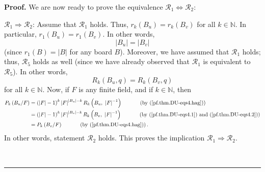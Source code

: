 \documentclass[numbers=enddot,12pt,final,onecolumn,notitlepage]{scrartcl}%
\theoremstyle{definition}
\newenvironment{proof}[1][Proof]{\noindent\textbf{#1.} }{\ \rule{0.5em}{0.5em}}
\newcommand{\NN}{\mathbb{N}}
\newenvironment{verlong}{}{}
\begin{document}
\begin{verlong}
\begin{proof}
We are now ready to prove the equivalence $\mathcal{R}_1\Longleftrightarrow
\mathcal{R}_2$:

$\mathcal{R}_1\Longrightarrow\mathcal{R}_2$:
Assume that $\mathcal{R}_1$ holds. Thus, $r_{k}\left(  B_{u}\right)  =r_{k}\left(  B_{v}\right)  $
for all $k\in\NN$. In particular, $r_{1}\left(  B_{u}\right)
=r_{1}\left(  B_{v}\right)  $. In other words,
\begin{equation}
\left\vert B_{u}\right\vert =\left\vert B_{v}\right\vert
\label{pf.thm.DU-eqs4.1}%
\end{equation}
(since $r_{1}\left(  B\right)  =\left\vert B\right\vert $ for any board $B$).
Moreover, we have assumed that $\mathcal{R}_1$ holds; thus, $\mathcal{R}_5$ holds as well
(since we have already observed that $\mathcal{R}_1$ is
equivalent to $\mathcal{R}_5$). In other words,%
\begin{equation}
R_{k}\left(  B_{u},q\right)  =R_{k}\left(  B_{v},q\right)
\label{pf.thm.DU-eqs4.2}%
\end{equation}
for all $k\in\NN$. Now, if $F$ is any finite field, and if
$k\in\NN$, then%
\begin{align*}
P_{k}\left(  B_{u}/F\right)    & =\left(  \left\vert F\right\vert -1\right)
^{k}\left\vert F\right\vert ^{\left\vert B_{u}\right\vert -k}R_{k}\left(
B_{u},\ \left\vert F\right\vert ^{-1}\right)  \ \ \ \ \ \ \ \ \ \ \left(
\text{by (\ref{pf.thm.DU-eqs4.hag})}\right)  \\
& =\left(  \left\vert F\right\vert -1\right)  ^{k}\left\vert F\right\vert
^{\left\vert B_{v}\right\vert -k}R_{k}\left(  B_{v},\ \left\vert F\right\vert
^{-1}\right)  \ \ \ \ \ \ \ \ \ \ \left(  \text{by (\ref{pf.thm.DU-eqs4.1})
and (\ref{pf.thm.DU-eqs4.2})}\right)  \\
& =P_{k}\left(  B_{v}/F\right)  \ \ \ \ \ \ \ \ \ \ \left(  \text{by
(\ref{pf.thm.DU-eqs4.hag})}\right)  .
\end{align*}
In other words, statement $\mathcal{R}_2$ holds. This proves the implication
$\mathcal{R}_1\Longrightarrow\mathcal{R}_2$.


\end{proof}
\end{verlong}
\end{document}
